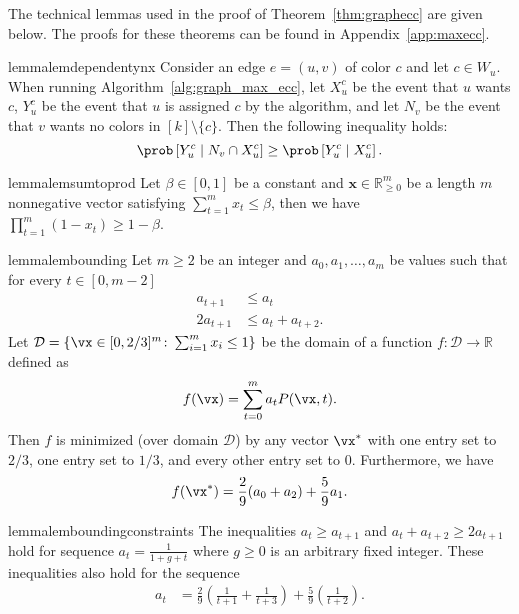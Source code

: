 The technical lemmas used in the proof of Theorem~\ref{thm:graphecc} are given below. The proofs for these theorems can be found in Appendix~\ref{app:maxecc}.
\begin{restatable}{lemma}{lemdependentynx}
	\label{lem:dependent_y_n_x}
	Consider an edge $e = (u,v)$ of color $c$ and let $c \in W_u$. When running Algorithm~\ref{alg:graph_max_ecc}, let $X_u^c$ be the event that $u$ wants $c$, $Y_u^c$ be the event that $u$ is assigned $c$ by the algorithm, and let $N_v$ be the event that $v$ wants no colors in $[k]\setminus\{c\}$.
	Then the following inequality holds:
	\[
		\prob\left[Y_u^c \mid N_v \cap X_u^c\right] \geq \prob\left[Y_u^c \mid X_u^c\right].
	\]
\end{restatable}

\begin{restatable}{lemma}{lemsumtoprod}
	\label{lem:sum_to_prod}
	Let $\beta \in [0,1]$ be a constant and $\mathbf{x} \in \mathbb{R}^m_{\geq 0}$ be a length $m$ nonnegative vector satisfying $\sum_{t=1}^m x_t \leq \beta$, then we have $\prod_{t=1}^m (1 - x_t) \geq 1 - \beta$.
\end{restatable}

\begin{restatable}{lemma}{lembounding}
	\label{lem:bounding}
	Let $m \geq 2$ be an integer and
	$a_0, a_1, \hdots, a_m$ be values such that for every $t \in [0, m-2]$
	\begin{align*}
		a_{t+1}   & \leq a_t            \\
		2 a_{t+1} & \leq a_t + a_{t+2}.
	\end{align*}
	Let $\mathcal{D} = \{ \vx \in [0,2/3]^m \colon \sum_{i = 1}^m x_i \leq 1 \}$ be the domain of a function
	$f : \mathcal{D} \rightarrow \mathbb{R}$ defined as
	\[
		f(\vx) = \sum_{t=0}^m a_t P(\vx, t).
	\]
	Then $f$ is minimized (over domain $\mathcal{D}$) by any vector $\vx^*$ with one entry set to $2/3$, one entry set to $1/3$, and every other entry set to $0$. Furthermore, we have
	\begin{equation}
		\label{eq:minval}
		f(\vx^*) = \frac{2}{9}(a_0 + a_2) + \frac{5}{9}a_1.
	\end{equation}
\end{restatable}

\begin{restatable}{lemma}{lemboundingconstraints}
	\label{lem:bounding_constraints}
	The inequalities $a_t \geq a_{t+1}$ and $a_t + a_{t+2} \geq 2a_{t+1}$ hold for sequence $a_t = \frac{1}{1+g+t}$ where $g \geq 0$ is an arbitrary fixed integer. These inequalities also hold for the sequence
	\begin{align}
		\label{eq:complicatedat}
		a_t & = \frac{2}{9}\left( \frac{1}{t+1} + \frac{1}{t+3} \right) + \frac{5}{9} \left( \frac{1}{t+2} \right).
	\end{align}
\end{restatable}

